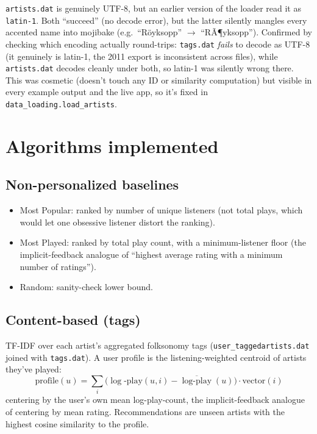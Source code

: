 \documentclass[11pt,a4paper]{article}
\newcommand{\code}[1]{\texttt{#1}}
\begin{document}
\code{artists.dat} is genuinely UTF-8, but an earlier version of the loader read it as \code{latin-1}. Both ``succeed'' (no decode error), but the latter silently mangles every accented name into mojibake (e.g.\ ``R\"oyksopp'' $\to$ ``RÃ¶yksopp''). Confirmed by checking which encoding actually round-trips: \code{tags.dat} \emph{fails} to decode as UTF-8 (it genuinely is latin-1, the 2011 export is inconsistent across files), while \code{artists.dat} decodes cleanly under both, so latin-1 was silently wrong there. This was cosmetic (doesn't touch any ID or similarity computation) but visible in every example output and the live app, so it's fixed in \code{data\_loading.load\_artists}.

\section{Algorithms implemented}
\label{sec:algorithms}

\subsection{Non-personalized baselines}

\begin{itemize}[leftmargin=*]
  \item Most Popular: ranked by number of unique listeners (not total plays, which would let one obsessive listener distort the ranking).
  \item Most Played: ranked by total play count, with a minimum-listener floor (the implicit-feedback analogue of ``highest average rating with a minimum number of ratings'').
  \item Random: sanity-check lower bound.
\end{itemize}

\subsection{Content-based (tags)}

TF-IDF over each artist's aggregated folksonomy tags (\code{user\_taggedartists.dat} joined with \code{tags.dat}). A user profile is the listening-weighted centroid of artists they've played:
\begin{equation}
\text{profile}(u) = \sum_i \big(\log\text{-}\text{play}(u,i) - \overline{\log\text{-}\text{play}}(u)\big) \cdot \text{vector}(i)
\end{equation}
centering by the user's own mean log-play-count, the implicit-feedback analogue of centering by mean rating. Recommendations are unseen artists with the highest cosine similarity to the profile.
\end{document}

